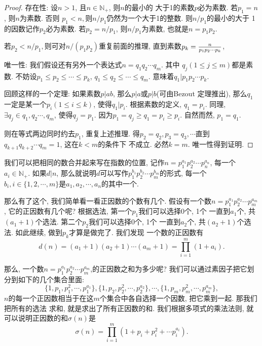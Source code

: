 \begin{proof}
    存在性: 设$n>1$, 且$n\in \mathbb N_+$, 则$n$的最小的
    大于1的素数$p$必为素数. 若$p_1=n$, 则$n$为素数. 否则
    $p_1<n, $则$n/p_1$仍然为一个大于1的整数. 则$n/p_1$的最小的大于
    1的因数记作$p_2$必为素数. 若$p_2=n/p_1$, 
    则$n/p_1$为素数, 也就是$n=p_1p_2$. 

    若$p_2<n/p_1,$则可对$n/(p_1p_2)$重复前面的推理, 直到素数$p_k={n\over p_1p_2\cdots p_k}$,

    唯一性: 我们假设还有另外一个表达式$n=q_1q_2\cdots q_m$. 其中 
    $q_j(1\leq j\leq m)$都是素数. 不妨设$p_1\leq p_2\leq \cdots\leq p_k$,
    $q_1\leq q_2\leq \cdots\leq q_m$. 意味着$q_1|p_1p_2\cdots p_k$.

    回顾这样的一个定理: 如果素数$p|ab$, 那么$p|a$或$p|b$(可由Bezout
    定理推出), 那么$q_1$一定是某一个$p_i(1\leq i\leq k)$, 使得$q_1|p_i$. 
    根据素数的定义, $q_1=p_i$. 同理, $\exists q_j\in {q_1, q_2\cdots,q_m}$, 
    使得$q_j=p_1$. 因为$p_1=q_j\geq q_1=p_i\geq p_i$. 自然而然, $p_1=q_1$. 

    则在等式两边同时约去$p_1$, 重复上述推理. 得$p_2=q_2, p_3=q_3,
    \cdots$直到$q_{k+1}q_{k+2}\cdots q_m=1$, 这在$k<m$的条件下
    不成立. 必然$k=m.$ 唯一性得到证明. 
\end{proof}

我们可以把相同的数合并起来写在指数的位置, 记作$n=p_1^{a_1}p_2^{a_2}\cdots p_n^{a_n}$,
每一个$a_i\in \mathbb N_+$. 如果$d|n$, 那么就说明$d$可以写作$p_1^{b_1}p_2^{b_2}\cdots 
p_m^{b_m}$的形式, 每一个$b_i,i\in\{1,2,\cdots,m\}$是$a_1, a_2,\cdots, a_n$的其中一个.

那么有了这个, 我们简单看一看正因数的个数有几个. 假设有一个数$n=p_1^{a_1}p_2^{a_2}\cdots p_m^{a_m}$, 它的正因数有几个呢? 根据选法, 第一个$p_1$我们可以选择0个, 1个
一直到$a_1$个, 共$(a_1+1)$个选法. 第二个$p_2$我们可以选择0个, 1个
一直到$a_2$个, 共$(a_2+1)$个选法. 如此继续, 做到$p_k$才算是做完了. 我们发现
一个数的正因数有$$d(n)=(a_1+1)(a_2+1)\cdots(a_m+1)=\prod_{i=1}^m (1+a_i).$$

那么, 一个数$n=p_1^{a_1}p_2^{a_2}\cdots p_m^{a_m}$,的正因数之和为多少呢? 
我们可以通过素因子把它划分到如下的几个集合里面: 
$$
\{1, p_1, p_1^2, \cdots, p_1^{a_1}\}, \{1, p_2, p_2^2, \cdots, p_2^{a_2}\}, 
\cdots, \{1, p_m, p_m^2, \cdots, p_m^{a_m}\}, 
$$
$n$的每一个正因数相当于在这$m$个集合中各自选择一个因数, 把它乘到一起. 那我们把所有的选法
求和, 就是求出了所有正因数的和. 我们根据多项式的乘法法则, 就可以说明正因数的和$\sigma(n)$是
$$
\sigma(n)=\prod_{i=1}^m (1+p_i+p_i^2+\cdots p_i^{a_i}). 
$$

